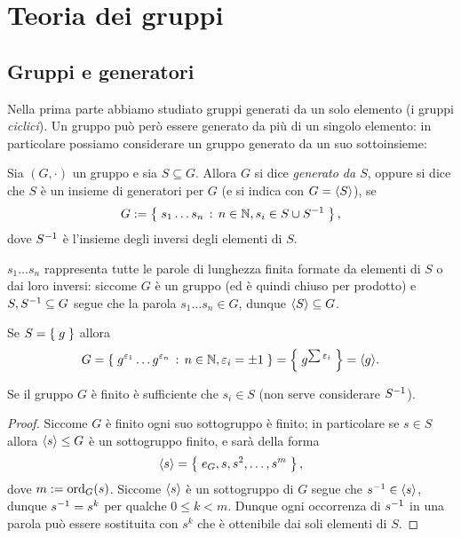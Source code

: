 \chapter{Teoria dei gruppi}

\section{Gruppi e generatori}

Nella prima parte abbiamo studiato gruppi generati da un solo elemento (i gruppi \emph{ciclici}). Un gruppo può però essere generato da più di un singolo elemento: in particolare possiamo considerare un gruppo generato da un suo sottoinsieme:

\begin{definition}
    Sia $(G, \cdot)$ un gruppo e sia $S \subseteq G$. Allora $G$ si dice \emph{generato da $S$}, oppure si dice che $S$ è un insieme di generatori per $G$ (e si indica con $G = \gen*{S}$), se \[
        G \deq \set{s_1\dots s_n \suchthat n \in \N, s_i \in S \union S\inv},
    \] dove $S\inv$ è l'insieme degli inversi degli elementi di $S$.
\end{definition}

\begin{remark}
    $s_1 \dots s_n$ rappresenta tutte le parole di lunghezza finita formate da elementi di $S$ o dai loro inversi: siccome $G$ è un gruppo (ed è quindi chiuso per prodotto) e $S, S\inv \subseteq G$ segue che la parola $s_1 \dots s_n \in G$, dunque $\gen{S} \subseteq G$.
\end{remark}

\begin{remark}
    Se $S = \set{g}$ allora \[
        G = \set{g^{\eps_1}\dots g^{\eps_n} \suchthat n \in \N, \eps_i = \pm 1} = \set{g^{\sum \eps_i}} = \gen{g}.
    \]
\end{remark}

\begin{remark}
    Se il gruppo $G$ è finito è sufficiente che $s_i \in S$ (non serve considerare $S\inv$).
    \begin{proof}
        Siccome $G$ è finito ogni suo sottogruppo è finito; in particolare se $s \in S$ allora $\gen{s} \sgr G$ è un sottogruppo finito, e sarà della forma \[
            \gen{s} = \set{e_G, s, s^2, \dots, s^m},    
        \] dove $m \deq \ord[G]{s}$.
        Siccome $\gen s$ è un sottogruppo di $G$ segue che $s\inv \in \gen s$, dunque $s\inv = s^k$ per qualche $0 \leq k < m$.
        Dunque ogni occorrenza di $s\inv$ in una parola può essere sostituita con $s^k$ che è ottenibile dai soli elementi di $S$. 
    \end{proof}
\end{remark}

